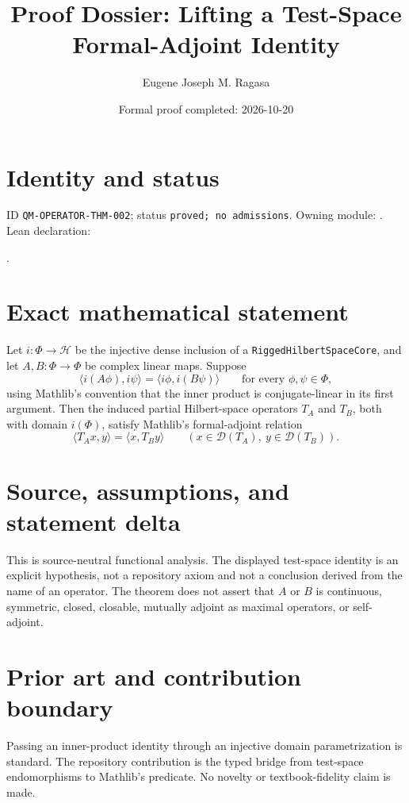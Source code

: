 \documentclass[11pt]{article}
\title{Proof Dossier: Lifting a Test-Space Formal-Adjoint Identity}
\author{Eugene Joseph M. Ragasa}
\date{Formal proof completed: 2026-10-20}
\begin{document}
\maketitle

\section{Identity and status}
ID \texttt{QM-OPERATOR-THM-002}; status \texttt{proved; no admissions}.
Owning module: .
Lean declaration:
\par{}.

\section{Exact mathematical statement}
Let $i:\Phi\to\mathcal H$ be the injective dense inclusion of a
\texttt{RiggedHilbertSpaceCore}, and let $A,B:\Phi\to\Phi$ be complex linear maps. Suppose
\[
  \langle i(A\phi),i\psi\rangle
  =\langle i\phi,i(B\psi)\rangle
  \qquad\text{for every }\phi,\psi\in\Phi,
\]
using Mathlib's convention that the inner product is conjugate-linear in its first argument. Then
the induced partial Hilbert-space operators $T_A$ and $T_B$, both with domain $i(\Phi)$, satisfy
Mathlib's formal-adjoint relation
\[
  \langle T_A x,y\rangle=\langle x,T_B y\rangle
  \qquad(x\in\mathcal D(T_A),\ y\in\mathcal D(T_B)).
\]

\section{Source, assumptions, and statement delta}
This is source-neutral functional analysis. The displayed test-space identity is an explicit
hypothesis, not a repository axiom and not a conclusion derived from the name of an operator. The
theorem does not assert that $A$ or $B$ is continuous, symmetric, closed, closable, mutually
adjoint as maximal operators, or self-adjoint.

\section{Prior art and contribution boundary}
Passing an inner-product identity through an injective domain parametrization is standard. The
repository contribution is the typed bridge from test-space endomorphisms to Mathlib's
 predicate. No novelty or textbook-fidelity claim is made.
\end{document}
